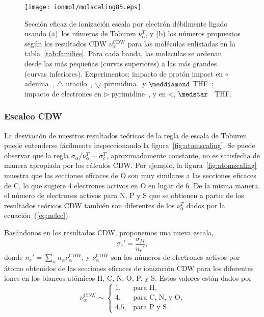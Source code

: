 \begin{figure*}[t!]
\centering
\texttt{[image: ionmol/molscaling85.eps]}
\caption[Sección eficaz de ionización por electrón débilmente ligado.]
{Sección eficaz de ionización escala por electrón débilmente ligado 
usando (a)~los números de Toburen $\nu_{\alpha}^T$, y (b) los
números propuestos según los resultados CDW $\nu_{\alpha}^{\text{CDW}}$ 
para las moléculas enlistadas en la tabla~\ref{tab:families}. 
Para cada banda, las moleculas se ordenan desde las más pequeñas (curvas
superiores) a las más grandes (curvas inferiores). Experimentos: 
impacto de protón impact en 
\mbox{\Large$\circ$} adenina~\cite{iriki2011}, 
$\triangle$ uracilo~\cite{itoh2013}, 
$\bigtriangledown$ pirimidina~\cite{wolff2014} y $\meddiamond$ 
THF~\cite{wang2016}; impacto de electrones en 
$\rhd$ pyrimidine~\cite{bug2017}, y en $\lhd$, 
$\medstar$~\cite{wolf2019,fuss2009} THF.}
\label{fig:newscaling}
\end{figure*}

\subsubsection{Escaleo CDW}

La desviación de nuestros resultados teóricos de la regla de escala de 
Toburen puede entenderse fácilmente inspeccionando la
figura~\ref{fig:atomscaling}. Se puede observar que la regla 
$\sigma_{\alpha}/\nu_{\alpha}^T\sim \sigma_{e}^T$, aproximadamente 
constante, no es satisfecha de manera apropiada por los cálculos CDW. 
Por ejemplo, la figura~\ref{fig:atomscaling} muestra que las secciones
eficaces de O son muy similares a las secciones eficaces de C, lo que 
sugiere 4 electrones activos en O en lugar de 6. De la misma manera, el 
número de electrones activos para N, P y S que se obtienen a partir de 
los resultados teóricos CDW también son diferentes de los $\nu_{\alpha}^T$ 
dados por la ecuación~(\ref{eq:nelec}).


Basándonos en los resultados CDW, proponemos una nueva escala,
\begin{equation}
\sigma_{e}'=\frac{\sigma_M}{n_e'},
\label{32} 
\end{equation}
donde $n_e'=\sum_{\alpha}n_{\alpha}\nu_{\alpha}^{\text{CDW}}$, y
$\nu_{\alpha}^{\text{CDW}}$ son los números de electrones activos 
por átomo obtenidos de las secciones eficaces de ionización CDW para los 
diferentes iones en los blancos atómicos H, C, N, O, P, y S. Estos 
valores están dados por
\begin{equation}
\nu_{\alpha }^{\text{CDW}} \sim\left\{ 
\begin{array}{ll}
1, & \text{para H,} \\
4, & \text{para C, N, y O,} \\ 
4.5, & \text{para P y S}\,.
\end{array}
\right. 
\label{eq:scalingCDW}
\end{equation}

